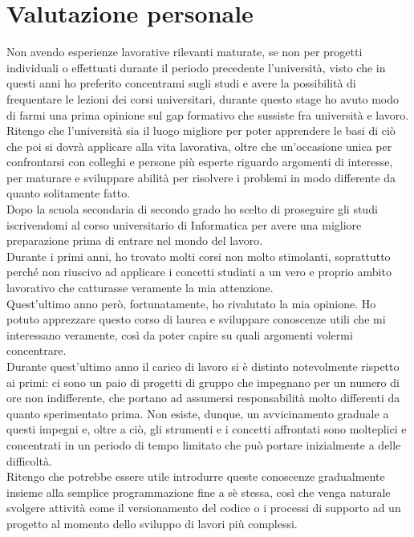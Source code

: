 \section{Valutazione personale}
Non avendo esperienze lavorative rilevanti maturate, se non per progetti individuali o effettuati durante il periodo precedente l'università, visto che in questi anni ho preferito concentrami sugli studi e avere la possibilità di frequentare le lezioni dei corsi universitari, durante questo stage ho avuto modo di farmi una prima opinione sul gap formativo che sussiste fra università e lavoro. \\ 
Ritengo che l'università sia il luogo migliore per poter apprendere le basi di ciò che poi si dovrà applicare alla vita lavorativa, oltre che un'occasione unica per confrontarsi con colleghi e persone più esperte riguardo argomenti di interesse, per maturare e sviluppare abilità per risolvere i problemi in modo differente da quanto solitamente fatto. \\ 
Dopo la scuola secondaria di secondo grado ho scelto di proseguire gli studi iscrivendomi al corso universitario di Informatica per avere una migliore preparazione prima di entrare nel mondo del lavoro. \\
Durante i primi anni, ho trovato molti corsi non molto stimolanti, soprattutto perché non riuscivo ad applicare i concetti studiati a un vero e proprio ambito lavorativo che catturasse veramente la mia attenzione. \\ 
Quest'ultimo anno però, fortunatamente, ho rivalutato la mia opinione. Ho potuto apprezzare questo corso di laurea e sviluppare conoscenze utili che mi interessano veramente, così da poter capire su quali argomenti volermi concentrare. \\
Durante quest'ultimo anno il carico di lavoro si è distinto notevolmente rispetto ai primi: ci sono un paio di progetti di gruppo che impegnano per un numero di ore non indifferente, che portano ad assumersi responsabilità molto differenti da quanto sperimentato prima. Non esiste, dunque, un avvicinamento graduale a questi impegni e, oltre a ciò, gli strumenti e i concetti affrontati sono molteplici e concentrati in un periodo di tempo limitato che può portare inizialmente a delle difficoltà. \\
Ritengo che potrebbe essere utile introdurre queste conoscenze gradualmente insieme alla semplice programmazione fine a sè stessa, così che venga naturale svolgere attività come il versionamento del codice o i processi di supporto ad un progetto al momento dello sviluppo di lavori più complessi. \\\\
